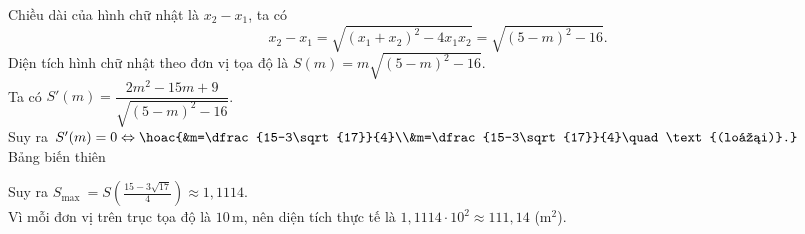 \begin{ex}
{		Chiều dài của hình chữ nhật là $x_2-x_1$, ta có
		$$x_2-x_1=\sqrt{(x_1+x_2)^2-4x_1x_2}=\sqrt{(5-m)^2-16}.$$
		Diện tích hình chữ nhật theo đơn vị tọa độ là $S(m)=m\sqrt{(5-m)^2-16}$.\\
		Ta có $S'(m)=\dfrac{2 m^2-15 m+9}{\sqrt{(5-m)^2-16}}$.\\
		Suy ra $S'(m)=0\Leftrightarrow \hoac{&m=\dfrac{15-3\sqrt{17}}{4}\\&m=\dfrac{15-3\sqrt{17}}{4}\quad\text{(loại)}.}$\\				
		Bảng biến thiên
		\begin{center}
		\end{center}
		Suy ra $S_{\text{max }}=S\left(\tfrac{15-3\sqrt{17}}{4}\right)\approx 1{,}1114$.\\
		Vì mỗi đơn vị trên trục tọa độ là $10$\,m, nên diện tích thực tế là	$1{,}1114\cdot 10^2\approx 111{,}14$ (m$^2$).
	}
\end{ex}
